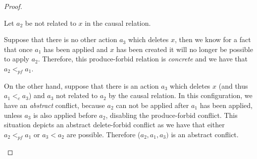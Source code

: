 \begin{proof}
\begin{description}[style=nextline,leftmargin=*]
  \item[Triggering element is not related to the action:]
    Let $a_2$ be not related to $x$ in the causal relation.

    Suppose that there is no other action $a_3$ which deletes $x$, then we know for a fact that once $a_1$ has been applied and $x$ has been created it will no longer be possible to apply $a_2$. Therefore, this produce-forbid relation is \emph{concrete} and we have that $a_2 <_{pf} a_1$.

    On the other hand, suppose that there is an action $a_3$ which deletes $x$ (and thus $a_1 <_c a_3$) and $a_3$ not related to $a_2$ by the causal relation. In this configuration, we have an \emph{abstract} conflict, because $a_2$ can not be applied after $a_1$ has been applied, unless $a_3$ is also applied before $a_2$, disabling the produce-forbid conflict.
    This situation depicts an abstract delete-forbid conflict as we have that either \mbox{$a_2 <_{pf} a_1$} or \mbox{$a_3 < a_2$} are possible. Therefore \mbox{($a_2,a_1,a_3)$} is an abstract conflict.
\end{description}
\end{proof}

